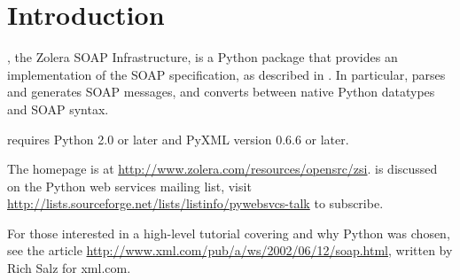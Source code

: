 \chapter{Introduction}

\ZSI{}, the Zolera SOAP Infrastructure, is a Python package that
provides an implementation of the SOAP specification, as described in
.
In particular, \ZSI{} parses and generates SOAP messages, and
converts between native Python datatypes and SOAP syntax.

 requires Python 2.0 or later and PyXML version 0.6.6 or later.

The  homepage is at
\url{http://www.zolera.com/resources/opensrc/zsi}.
\ZSI{} is discussed on the Python web services mailing list, visit
\url{http://lists.sourceforge.net/lists/listinfo/pywebsvcs-talk}
to subscribe.

For those interested in a high-level tutorial covering \ZSI{} and why
Python was chosen, see the article
\url{http://www.xml.com/pub/a/ws/2002/06/12/soap.html}, 
written by Rich Salz for xml.com.

